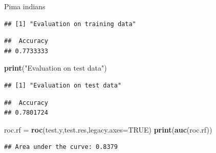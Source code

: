\documentclass[
  ignorenonframetext,
]{beamer}
\newenvironment{Shaded}{\begin{snugshade}}{\end{snugshade}}
\newcommand{\DataTypeTok}[1]{\textcolor[rgb]{0.13,0.29,0.53}{#1}}
\newcommand{\DecValTok}[1]{\textcolor[rgb]{0.00,0.00,0.81}{#1}}
\newcommand{\KeywordTok}[1]{\textcolor[rgb]{0.13,0.29,0.53}{\textbf{#1}}}
\newcommand{\NormalTok}[1]{#1}
\newcommand{\OperatorTok}[1]{\textcolor[rgb]{0.81,0.36,0.00}{\textbf{#1}}}
\newcommand{\OtherTok}[1]{\textcolor[rgb]{0.56,0.35,0.01}{#1}}
\newcommand{\StringTok}[1]{\textcolor[rgb]{0.31,0.60,0.02}{#1}}
\begin{document}
\begin{frame}[fragile]
\begin{block}{Pima indians}
\begin{verbatim}
## [1] "Evaluation on training data"
\end{verbatim}

\begin{Shaded}
\end{Shaded}

\begin{verbatim}
##  Accuracy 
## 0.7733333
\end{verbatim}

\begin{Shaded}
\begin{Highlighting}[]
\KeywordTok{print}\NormalTok{(}\StringTok{"Evaluation on test data"}\NormalTok{)}
\end{Highlighting}
\end{Shaded}

\begin{verbatim}
## [1] "Evaluation on test data"
\end{verbatim}

\begin{Shaded}
\end{Shaded}

\begin{verbatim}
##  Accuracy 
## 0.7801724
\end{verbatim}

\begin{Shaded}
\begin{Highlighting}[]
\NormalTok{roc.rf =}\StringTok{ }\KeywordTok{roc}\NormalTok{(test.y,test.res,}\DataTypeTok{legacy.axes=}\OtherTok{TRUE}\NormalTok{)}
\KeywordTok{print}\NormalTok{(}\KeywordTok{auc}\NormalTok{(roc.rf))}
\end{Highlighting}
\end{Shaded}

\begin{verbatim}
## Area under the curve: 0.8379
\end{verbatim}


\end{block}
\end{frame}
\end{document}

